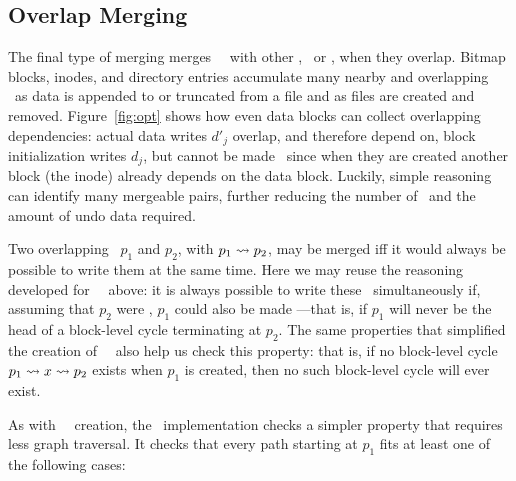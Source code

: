 \subsection{Overlap Merging}
\label{sec:patches:merge:overlap}

The final type of merging merges \rb\ \patches\ with other \patches,
\nrb\ or \rb, when they overlap.
%
Bitmap blocks, inodes, and directory entries accumulate many nearby
and overlapping \patches\ as data is appended to or truncated from a
file and as files are created and removed.
%
Figure~\ref{fig:opt} shows how even data blocks can collect overlapping
dependencies: actual data writes $d'_j$ overlap, and therefore depend on,
block initialization writes $d_j$, but cannot be made \nrb\ since when they
are created another block (the inode) already depends on the data block.
%
Luckily, simple reasoning can identify many mergeable pairs,
further reducing the number of \patches\ and the amount of undo data
required.


Two overlapping \patches\ $p_1$ and $p_2$, with $p_1 \leadsto p_2$, may be
merged iff it would always be possible to write them at the same time.
%
Here we may reuse the reasoning developed for \nrb\ \patches\ above: it is
always possible to write these \patches\ simultaneously if, assuming that
$p_2$ were \nrb, $p_1$ could also be made \nrb---that is, if $p_1$ will
never be the head of a block-level cycle terminating at $p_2$.
%
The same properties that simplified the creation of \nrb\ \patches\ also help
us check this property: that is, if no block-level cycle $p_1 \leadsto x
\leadsto p_2$ exists when $p_1$ is created, then no such block-level cycle
will ever exist.


As with \nrb\ \patch\ creation, the \Kudos\ implementation checks a simpler
property that requires less graph traversal.
%
It checks that every path starting at $p_1$ fits at least one of the
following cases:


%
% 
%

